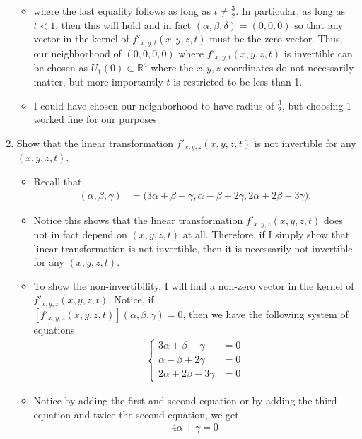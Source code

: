 \documentclass[10pt,a4paper]{article}
\theoremstyle{definition}
\theoremstyle{definition}
\numberwithin{equation}{section}
\begin{document}
\begin{enumerate}[label = (\alph*)]
\begin{itemize}
	\item where the last equality follows as long as $t \neq \frac{3}{2}$. In particular, as long as $t < 1$, then this will hold and in fact $(\alpha, \beta, \delta) = (0,0,0)$ so that any vector in the kernel of $f'_{x, y, t}(x, y, z, t)$ must be the zero vector. Thus, our neighborhood of $(0,0,0,0)$ where $f'_{x, y, t}(x, y, z, t)$ is invertible can be chosen as $U_1(0) \subset \mathbb{R}^4$ where the $x, y, z$-coordinates do not necessarily matter, but more importantly $t$ is restricted to be less than 1. 
	\item I could have chosen our neighborhood to have radius of $\frac{3}{2}$, but choosing 1 worked fine for our purposes. 
	\end{itemize}
\item Show that the linear transformation $f'_{x, y, z}(x, y, z, t)$ is not invertible for any $(x, y, z, t)$. 
	\begin{itemize}
	\item Recall that 
	\begin{align*}
	[f'_{x, y, z}(x, y, z, t)](\alpha, \beta, \gamma) &= \bigg(3\alpha + \beta - \gamma, \alpha - \beta + 2\gamma, 2\alpha + 2\beta - 3\gamma\bigg).
	\end{align*}
	\item Notice this shows that the linear transformation $f'_{x, y, z}(x, y, z, t)$ does not in fact depend on $(x, y, z, t)$ at all. Therefore, if I simply show that linear transformation is not invertible, then it is necessarily not invertible for any $(x, y, z, t)$. 
	\item To show the non-invertibility, I will find a non-zero vector in the kernel of $f'_{x, y, z}(x, y, z, t)$. Notice, if\\$[f'_{x, y, z}(x, y, z, t)](\alpha, \beta, \gamma) = 0$, then we have the following system of equations
	\begin{align*}
	\begin{cases}
	3\alpha + \beta - \gamma &= 0\\
	\alpha - \beta + 2\gamma &= 0\\
	2\alpha + 2\beta - 3\gamma &= 0
	\end{cases}
	\end{align*}
	\item Notice by adding the first and second equation or by adding the third equation and twice the second equation, we get
	\begin{align*}
	4\alpha + \gamma = 0
	\end{align*}

\end{itemize}
\end{enumerate}
\end{document}
